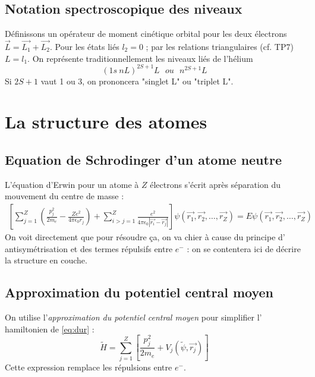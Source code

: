 \documentclass	[11pt, a4paper, openany]{book}
\begin{document}
	\subsection{Notation spectroscopique des niveaux}
	Définissons un opérateur de moment cinétique orbital pour les deux électrons $\vec{L}
	=\vec{L_1}+\vec{L_2}$. Pour les états liés $l_2=0$ ; par les relations triangulaires 
	(cf. TP7) $L=l_1$. On représente traditionnellement les niveaux liés de l'hélium
	\begin{equation}
		(1s\ nL)^{2S+1}L\ \ \ ou\ \ \ n^{2S+1}L
	\end{equation}
	Si $2S+1$ vaut 1 ou 3, on prononcera "singlet L" ou "triplet L".
		
		
	\section{La structure des atomes}
	\subsection{Equation de Schrodinger d'un atome neutre}
	L'équation d'Erwin pour un atome à $Z$ électrons s'écrit après séparation du 
	mouvement du centre de masse :
	\begin{multline}
		\left[\sum_{j=1}^Z \left(\frac{p_j^2}{2m_e}-\frac{Ze^2}{4\pi\epsilon_0r_j}\right) + 
		\sum_{i>j=1}^Z \frac{e^2}{4\pi\epsilon_0|\vec{r_i}-\vec{r_j}|}\right]\psi(\vec{r_1},
		\vec{r_2},\dots,\vec{r_Z})
		= E\psi(\vec{r_1},\vec{r_2},\dots,\vec{r_Z})
		\label{eq:dur}
	\end{multline}
	On voit directement que pour résoudre ça, on va chier à cause du principe d'
	antisymétrisation et des termes répulsifs entre $e^-$ : on se contentera ici de
	décrire la structure en couche.
		
	\subsection{Approximation du potentiel central moyen}
	On utilise l'\textit{approximation du potentiel central moyen} pour simplifier l'
	hamiltonien de \autoref{eq:dur} :
	\begin{equation}
		\tilde{H} = \sum_{j=1}^Z \left[\frac{p_j^2}{2m_e}+V_j(\tilde{\psi},\vec{r_j})\right]
		\label{eq:ApproxCentralMoyen}
	\end{equation}
	Cette expression remplace les répulsions entre $e^-$.
		
\end{document}
